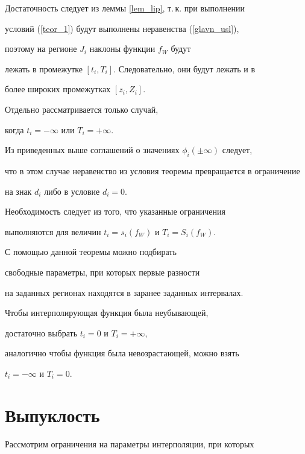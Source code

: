\begin{pf}


Достаточность следует из леммы \ref{lem_lip}, т.\,к. при выполнении


условий (\ref{teor_1}) будут выполнены неравенства (\ref{glavn_usl}),


поэтому на регионе $J_i$ наклоны функции $f_W$ будут


лежать в промежутке $[t_i, T_i]$. Следовательно, они будут лежать и в


более широких промежутках $[z_i,Z_i]$.


Отдельно рассматривается только случай,


когда $t_i=-\infty$ или $ T_i= +\infty $.


Из приведенных выше соглашений о значениях $ \phi_i(\pm\infty)$ следует,


что в этом случае неравенство из условия теоремы превращается в ограничение


на знак $d_i$ либо в условие $d_i=0$.





Необходимость следует из того, что указанные ограничения


выполняются для величин $ t_i = s_i(f_W) $ и $ T_i = S_i(f_W) $.


\end{pf}





С помощью данной теоремы можно подбирать


свободные параметры, при которых первые разности


на заданных регионах находятся в заранее заданных интервалах.


Чтобы интерполирующая функция была неубывающей,


достаточно выбрать $t_i=0$ и $T_i= + \infty$,


аналогично чтобы функция была невозрастающей, можно взять


$t_i=-\infty $ и $T_i= 0 $.





\section{Выпуклость}





Рассмотрим ограничения на параметры интерполяции, при которых


